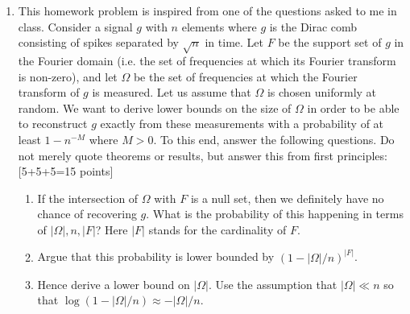 \documentclass[11pt]{article}
\begin{document}
\begin{enumerate}
\item This homework problem is inspired from one of the questions asked to me in class. Consider a signal $g$ with $n$ elements where $g$ is the Dirac comb consisting of spikes separated by $\sqrt{n}$ in time. Let $F$ be the support set of $g$ in the Fourier domain (i.e. the set of frequencies at which its Fourier transform is non-zero), and let $\Omega$ be the set of frequencies at which the Fourier transform of $g$ is measured. Let us assume that $\Omega$ is chosen uniformly at random. We want to derive lower bounds on the size of $\Omega$ in order to be able to reconstruct $g$ exactly from these measurements with a probability of at least $1-n^{-M}$ where $M > 0$. To this end, answer the following questions. Do not merely quote theorems or results, but answer this from first principles: \textsf{[5+5+5=15 points]}
\begin{enumerate}
\item If the intersection of $\Omega$ with $F$ is a null set, then we definitely have no chance of recovering $g$. What is the probability of this happening in terms of $|\Omega|, n, |F|$? Here $|F|$ stands for the cardinality of $F$. 
\item Argue that this probability is lower bounded by $(1-|\Omega|/n)^{|F|}$. 
\item Hence derive a lower bound on $|\Omega|$. Use the assumption that $|\Omega| \ll n$ so that $\log(1-|\Omega|/n) \approx -|\Omega|/n$. 

\end{enumerate} 

\end{enumerate}
\end{document}

